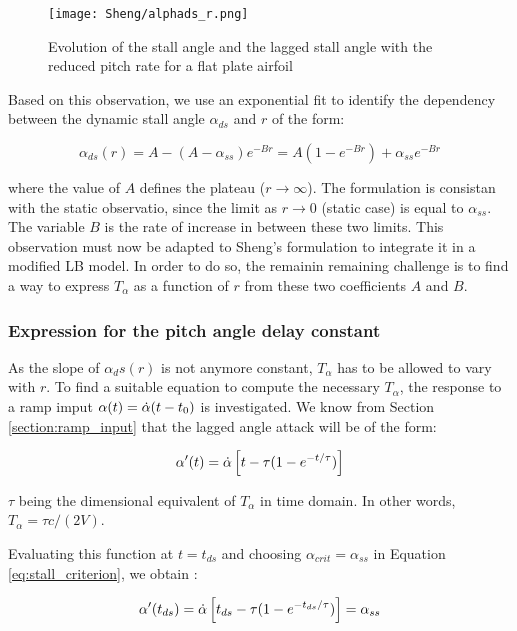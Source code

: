 \begin{figure}[h]
\centering
\texttt{[image: Sheng/alphads\_r.png]} 
\caption{Evolution of the stall angle and the lagged stall angle with the reduced pitch rate for a flat plate airfoil}
\label{fig:alphads_r}
\end{figure}

Based on this observation, we use an exponential fit to identify the dependency between the dynamic stall angle $\alpha_{ds}$ and $r$ of the form: 

\begin{equation}
\alpha_{ds}(r) = A-(A-\alpha_{ss})e^{-Br} = A(1-e^{-Br})+\alpha_{ss}e^{-Br}
\label{eq:alpha_ds_r}
\end{equation}

\noindent where the value of $A$ defines the plateau ($r \rightarrow \infty$). The formulation is consistan with the static observatio, since the limit as $r \rightarrow 0$ (static case) is equal to $\alpha_{ss}$. The variable $B$ is the rate of increase in between these two limits. This observation must now be adapted to Sheng's formulation to integrate it in a modified LB model. In order to do so, the remainin remaining challenge is to find a way to express $T_\alpha$ as a function of $r$ from these two coefficients $A$ and $B$.

\subsubsection{Expression for the pitch angle delay constant}
As the slope of $\alpha_ds(r)$ is not anymore constant, $T_\alpha$ has to be allowed to vary with $r$. To find a suitable equation to compute the necessary $T_{\alpha}$, the response to a ramp imput $\alpha(t) = \dot{\alpha}(t-t_0)$ is investigated. 
We know from Section \ref{section:ramp_input} that the lagged angle attack will be of the form:

\begin{equation}
\alpha'(t) = \dot{\alpha}\left[t- \tau(1-e^{-t/ \tau})\right]
\end{equation}

\noindent $\tau$ being the dimensional equivalent of $T_\alpha$ in time domain. In other words, $T_\alpha = \tau c/(2V)$.

Evaluating this function at $t=t_{ds}$ and choosing $\alpha_{crit}=\alpha_{ss}$ in Equation \eqref{eq:stall_criterion}, we obtain : 

\begin{equation}
\alpha'(t_{ds}) = \dot{\alpha}\left[t_{ds} - \tau(1-e^{-t_{ds} / \tau})\right] = \alpha_{ss}
\label{eq:alpha_ds_tau}
\end{equation}

